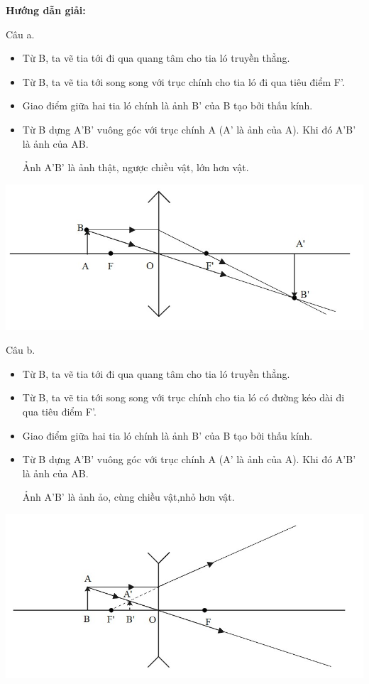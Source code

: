 {\begin{center}
	\textbf{Hướng dẫn giải:}
\end{center}

	Câu a. 
	\begin{itemize}
		\item Từ B, ta vẽ tia tới đi qua quang tâm cho tia ló truyền thẳng. 
		\item Từ B, ta vẽ tia tới song song với trục chính cho tia ló đi qua tiêu điểm F'.
		\item  Giao điểm giữa hai tia ló chính là ảnh B' của B tạo bởi thấu kính.
		\item Từ B dựng A'B' vuông góc với trục chính A (A' là ảnh của A). Khi đó A'B' là ảnh của AB.
		
		Ảnh A'B' là ảnh thật, ngược chiều vật, lớn hơn vật.
	\end{itemize}
	\begin{center}
		\includegraphics[scale=0.7]{../figs/VN11-PH-38-A-004-1-h14.jpg}
	\end{center}
	Câu b. 
	\begin{itemize}
	\item Từ B, ta vẽ tia tới đi qua quang tâm cho tia ló truyền thẳng. 
	\item Từ B, ta vẽ tia tới song song với trục chính cho tia ló có đường kéo dài đi qua tiêu điểm F'.
	\item  Giao điểm giữa hai tia ló chính là ảnh B' của B tạo bởi thấu kính.
	\item Từ B dựng A'B' vuông góc với trục chính A (A' là ảnh của A). Khi đó A'B' là ảnh của AB.
	
	Ảnh A'B' là ảnh ảo, cùng chiều vật,nhỏ hơn vật.
	\end{itemize}
	\begin{center}
		\includegraphics[scale=0.7]{../figs/VN11-PH-38-A-004-1-h15.jpg}
	\end{center}
}
